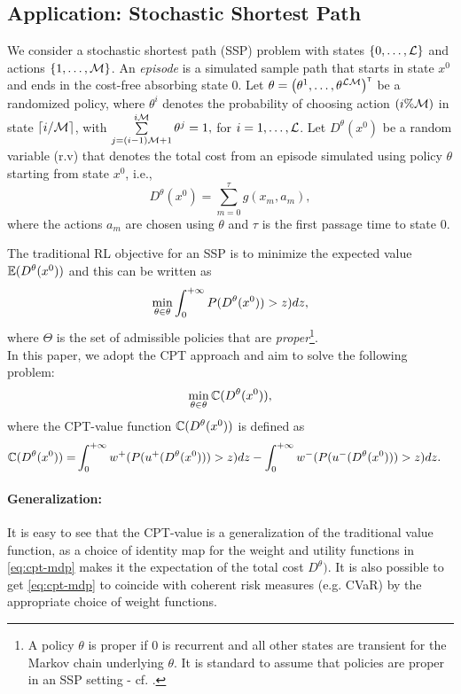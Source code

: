 \documentclass[11pt,letterpaper,english]{article}
\begin{document}
\subsection{Application: Stochastic Shortest Path}
We consider a stochastic shortest path (SSP) problem with states $\{0,\ldots,\mathcal{L}\}$ and actions $\{1,\ldots,\mathcal{M}\}$. 
An \textit{episode} is a simulated sample path that starts in state $x^0$ and ends in the cost-free absorbing state $0$. 
Let $\theta=\left(\theta^{1},\ldots,\theta^{\mathcal{L}\mathcal{M}}\right)^\mathsf{\scriptscriptstyle T}$ be a randomized policy, where $\theta^{i}$ denotes the probability of choosing action $(i\% \mathcal{M})$ in state $\left \lceil{i/\mathcal{M}}\right \rceil$, with $\sum\limits_{j=(i-1)\mathcal{M}+1}^{i\mathcal{M}} \theta^{j} = 1,$ for $i=1,\ldots,\mathcal{L}$. 
Let $D^\theta(x^0)$ be a random variable (r.v) that denotes the total cost from an episode simulated using policy $\theta$ starting from state $x^0$, i.e.,
$$ D^\theta(x^0) = \sum\limits_{m=0}^{\tau} g(x_m,a_m), $$
where the actions $a_m$ are chosen using  $\theta$ and
$\tau$ is the first passage time to state $0$. 

The traditional RL objective for an SSP is to minimize the expected value $\mathbb{E} (D^\theta(x^0))$ and this can be written as
$$\min_{\theta\in\theta} \int_0^{+\infty} P(D^\theta(x^0))>z) dz,$$ where $\Theta$ is the set of admissible policies that are \textit{proper}\footnote{A policy $\theta$ is proper if $0$ is recurrent and all other states are transient for the Markov chain underlying $\theta$. It is standard to assume that policies are proper in an SSP setting - cf. \cite{bertsekas1995dynamic}.}.\\
In this paper, we adopt the CPT approach and aim to solve the following problem: 
$$ \min_{\theta \in \theta} \mathbb{C}(D^\theta(x^0)),$$
where the CPT-value function $\mathbb{C}(D^\theta(x^0))$ is defined as
\begin{align}
\mathbb{C}(D^\theta(x^0)) = &\int_0^{+\infty} w^+(P(u^+(D^\theta(x^0)))>z) dz - \int_0^{+\infty} w^-(P(u^-(D^\theta(x^0)))>z) dz. \label{eq:cpt-mdp}
\end{align}

\paragraph{Generalization:} It is easy to see that the CPT-value is a generalization of the traditional value function, as a choice of identity map for the weight and utility functions in \eqref{eq:cpt-mdp} makes it the expectation of the total cost $D^\theta)$.  It is also possible to get \eqref{eq:cpt-mdp} to coincide with coherent risk measures (e.g. CVaR) by the appropriate choice of weight functions.
\end{document}
